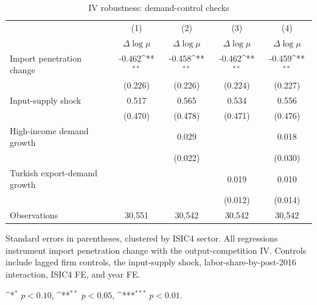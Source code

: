 \begin{table}[htbp]
\centering
\footnotesize
\setlength{\tabcolsep}{6pt}
\renewcommand{\arraystretch}{0.96}
\def\sym#1{\ifmmode^{#1}\else\(^{#1}\)\fi}

\begin{threeparttable}
\caption[IV robustness: demand-control checks]{IV robustness: demand-control checks}
\label{tab:iv_demand_controls}

\begin{tabular}{L{0.30\textwidth}*{4}{c}}
\toprule
& (1) & (2) & (3) & (4) \\
& $\Delta \log \mu$ & $\Delta \log \mu$ & $\Delta \log \mu$ & $\Delta \log \mu$ \\
\midrule
Import penetration change
& -0.462\sym{**} & -0.458\sym{**} & -0.462\sym{**} & -0.459\sym{**} \\
& (0.226) & (0.226) & (0.224) & (0.227) \\

\addlinespace[0.4em]
Input-supply shock
& 0.517 & 0.565 & 0.534 & 0.556 \\
& (0.470) & (0.478) & (0.471) & (0.476) \\

\addlinespace[0.4em]
High-income demand growth
&  & 0.029 &  & 0.018 \\
&  & (0.022) &  & (0.030) \\

\addlinespace[0.4em]
Turkish export-demand growth
&  &  & 0.019 & 0.010 \\
&  &  & (0.012) & (0.014) \\

\midrule
Observations
& 30,551 & 30,542 & 30,542 & 30,542 \\
\bottomrule
\end{tabular}

\begin{tablenotes}[flushleft]
\footnotesize
\item Standard errors in parentheses, clustered by ISIC4 sector. All regressions instrument import penetration change with the output-competition IV. Controls include lagged firm controls, the input-supply shock, labor-share-by-post-2016 interaction, ISIC4 FE, and year FE.
\item \sym{*} $p<0.10$, \sym{**} $p<0.05$, \sym{***} $p<0.01$.
\end{tablenotes}

\end{threeparttable}
\end{table}
